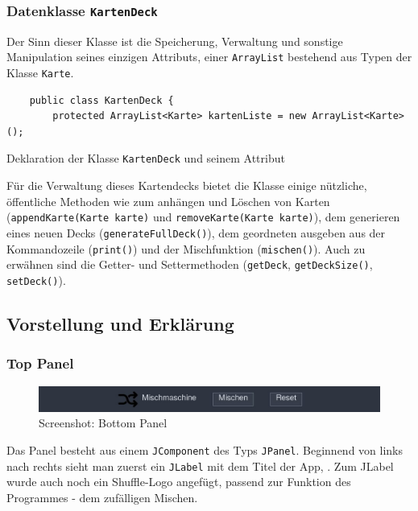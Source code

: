 \documentclass[a4paper,11pt]{article}
\begin{document}
\subsubsection{Datenklasse \texttt{KartenDeck}}

Der Sinn dieser Klasse ist die Speicherung, Verwaltung und sonstige Manipulation seines einzigen Attributs, einer \texttt{ArrayList} bestehend aus Typen der Klasse \texttt{Karte}.

\begin{listing}[H]
    \begin{verbatim}
    public class KartenDeck {
        protected ArrayList<Karte> kartenListe = new ArrayList<Karte>();
    \end{verbatim}
    \caption{Deklaration der Klasse \texttt{KartenDeck} und seinem Attribut}
\end{listing}

Für die Verwaltung dieses Kartendecks bietet die Klasse einige nützliche, öffentliche Methoden wie zum anhängen und Löschen von Karten (\texttt{appendKarte(Karte karte)} und \texttt{removeKarte(Karte karte)}), dem generieren eines neuen Decks (\texttt{generateFullDeck()}), dem geordneten ausgeben aus der Kommandozeile (\texttt{print()}) und der Mischfunktion (\texttt{mischen()}). Auch zu erwähnen sind die Getter- und Settermethoden (\texttt{getDeck}, \texttt{getDeckSize()}, \texttt{setDeck()}).


\subsection{Vorstellung und Erklärung}
\subsubsection{Top Panel}
\begin{figure}[H]
    \centering
    \includegraphics[width=.9\textwidth]{media/top-panel.jpg}
    \caption{Screenshot: Bottom Panel}
\end{figure}

Das Panel besteht aus einem \texttt{JComponent} des Typs \texttt{JPanel}. Beginnend von links nach rechts sieht man zuerst ein \texttt{JLabel} mit dem Titel der App, . Zum JLabel wurde auch noch ein Shuffle-Logo angefügt, passend zur Funktion des Programmes - dem zufälligen Mischen.\\
\end{document}
